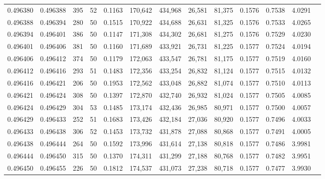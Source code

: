 \begin{tabular}{rrrrrrrrrrrrr}
0.496380 & 0.496388 & 395 &  52 &                                     0.1163 & 170,642 & 434,968 &  26,581 &  81,375 & 0.1576 & 0.7538 & 4.0291 \\
0.496388 & 0.496394 & 280 &  50 &                                     0.1515 & 170,922 & 434,688 &  26,631 &  81,325 & 0.1576 & 0.7533 & 4.0265 \\
0.496394 & 0.496401 & 386 &  50 &                                     0.1147 & 171,308 & 434,302 &  26,681 &  81,275 & 0.1576 & 0.7529 & 4.0230 \\
0.496401 & 0.496406 & 381 &  50 &                                     0.1160 & 171,689 & 433,921 &  26,731 &  81,225 & 0.1577 & 0.7524 & 4.0194 \\
0.496406 & 0.496412 & 374 &  50 &                                     0.1179 & 172,063 & 433,547 &  26,781 &  81,175 & 0.1577 & 0.7519 & 4.0160 \\
0.496412 & 0.496416 & 293 &  51 &                                     0.1483 & 172,356 & 433,254 &  26,832 &  81,124 & 0.1577 & 0.7515 & 4.0132 \\
0.496416 & 0.496421 & 206 &  50 &                                     0.1953 & 172,562 & 433,048 &  26,882 &  81,074 & 0.1577 & 0.7510 & 4.0113 \\
0.496421 & 0.496424 & 308 &  50 &                                     0.1397 & 172,870 & 432,740 &  26,932 &  81,024 & 0.1577 & 0.7505 & 4.0085 \\
0.496424 & 0.496429 & 304 &  53 &                                     0.1485 & 173,174 & 432,436 &  26,985 &  80,971 & 0.1577 & 0.7500 & 4.0057 \\
0.496429 & 0.496433 & 252 &  51 &                                     0.1683 & 173,426 & 432,184 &  27,036 &  80,920 & 0.1577 & 0.7496 & 4.0033 \\
0.496433 & 0.496438 & 306 &  52 &                                     0.1453 & 173,732 & 431,878 &  27,088 &  80,868 & 0.1577 & 0.7491 & 4.0005 \\
0.496438 & 0.496444 & 264 &  50 &                                     0.1592 & 173,996 & 431,614 &  27,138 &  80,818 & 0.1577 & 0.7486 & 3.9981 \\
0.496444 & 0.496450 & 315 &  50 &                                     0.1370 & 174,311 & 431,299 &  27,188 &  80,768 & 0.1577 & 0.7482 & 3.9951 \\
0.496450 & 0.496455 & 226 &  50 &                                     0.1812 & 174,537 & 431,073 &  27,238 &  80,718 & 0.1577 & 0.7477 & 3.9930 \\

\end{tabular}
